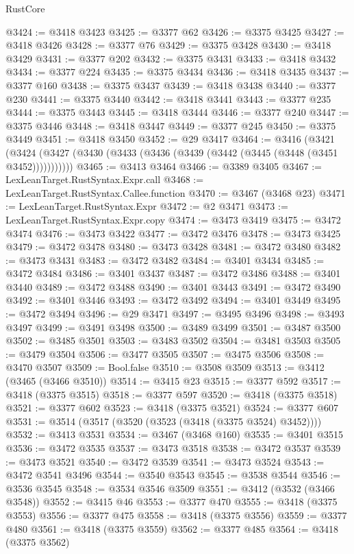 \begin{lexlean}{RustCore}
\begin{coremodule}
@3424 := @3418 @3423
@3425 := @3377 @62
@3426 := @3375 @3425
@3427 := @3418 @3426
@3428 := @3377 @76
@3429 := @3375 @3428
@3430 := @3418 @3429
@3431 := @3377 @202
@3432 := @3375 @3431
@3433 := @3418 @3432
@3434 := @3377 @224
@3435 := @3375 @3434
@3436 := @3418 @3435
@3437 := @3377 @160
@3438 := @3375 @3437
@3439 := @3418 @3438
@3440 := @3377 @230
@3441 := @3375 @3440
@3442 := @3418 @3441
@3443 := @3377 @235
@3444 := @3375 @3443
@3445 := @3418 @3444
@3446 := @3377 @240
@3447 := @3375 @3446
@3448 := @3418 @3447
@3449 := @3377 @245
@3450 := @3375 @3449
@3451 := @3418 @3450
@3452 := @29 @3417
@3464 := @3416
    (@3421 (@3424 (@3427 (@3430 (@3433 (@3436 (@3439 (@3442 (@3445 (@3448 (@3451 @3452)))))))))))
@3465 := @3413 @3464
@3466 := @3389 @3405
@3467 := LexLeanTarget.RustSyntax.Expr.call
@3468 := LexLeanTarget.RustSyntax.Callee.function
@3470 := @3467 (@3468 @23)
@3471 := LexLeanTarget.RustSyntax.Expr
@3472 := @2 @3471
@3473 := LexLeanTarget.RustSyntax.Expr.copy
@3474 := @3473 @3419
@3475 := @3472 @3474
@3476 := @3473 @3422
@3477 := @3472 @3476
@3478 := @3473 @3425
@3479 := @3472 @3478
@3480 := @3473 @3428
@3481 := @3472 @3480
@3482 := @3473 @3431
@3483 := @3472 @3482
@3484 := @3401 @3434
@3485 := @3472 @3484
@3486 := @3401 @3437
@3487 := @3472 @3486
@3488 := @3401 @3440
@3489 := @3472 @3488
@3490 := @3401 @3443
@3491 := @3472 @3490
@3492 := @3401 @3446
@3493 := @3472 @3492
@3494 := @3401 @3449
@3495 := @3472 @3494
@3496 := @29 @3471
@3497 := @3495 @3496
@3498 := @3493 @3497
@3499 := @3491 @3498
@3500 := @3489 @3499
@3501 := @3487 @3500
@3502 := @3485 @3501
@3503 := @3483 @3502
@3504 := @3481 @3503
@3505 := @3479 @3504
@3506 := @3477 @3505
@3507 := @3475 @3506
@3508 := @3470 @3507
@3509 := Bool.false
@3510 := @3508 @3509
@3513 := @3412 (@3465 (@3466 @3510))
@3514 := @3415 @23
@3515 := @3377 @592
@3517 := @3418 (@3375 @3515)
@3518 := @3377 @597
@3520 := @3418 (@3375 @3518)
@3521 := @3377 @602
@3523 := @3418 (@3375 @3521)
@3524 := @3377 @607
@3531 := @3514 (@3517 (@3520 (@3523 (@3418 (@3375 @3524) @3452))))
@3532 := @3413 @3531
@3534 := @3467 (@3468 @160)
@3535 := @3401 @3515
@3536 := @3472 @3535
@3537 := @3473 @3518
@3538 := @3472 @3537
@3539 := @3473 @3521
@3540 := @3472 @3539
@3541 := @3473 @3524
@3543 := @3472 @3541 @3496
@3544 := @3540 @3543
@3545 := @3538 @3544
@3546 := @3536 @3545
@3548 := @3534 @3546 @3509
@3551 := @3412 (@3532 (@3466 @3548))
@3552 := @3415 @46
@3553 := @3377 @470
@3555 := @3418 (@3375 @3553)
@3556 := @3377 @475
@3558 := @3418 (@3375 @3556)
@3559 := @3377 @480
@3561 := @3418 (@3375 @3559)
@3562 := @3377 @485
@3564 := @3418 (@3375 @3562)

\end{coremodule}
\end{lexlean}
